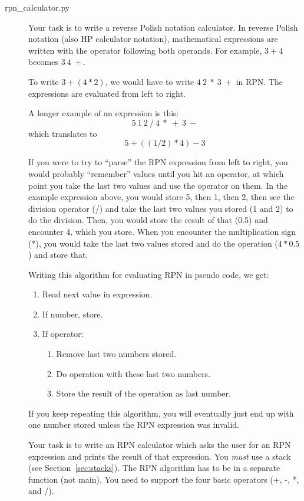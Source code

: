 \documentclass[11pt]{cselabheader}
\begin{document}
\begin{description}
  \item[rpn\_calculator.py] Your task is to write a reverse Polish notation
    calculator. In reverse Polish notation (also HP
    calculator notation), mathematical expressions are written with the operator
    following both operands. For example, $3 + 4$ becomes $3~4~+$.

    To write $3 + (4 * 2)$, we would have to write $4~2~*~3~+$ in RPN. The
    expressions are evaluated from left to right.

    A longer example of an expression is this: 
    \[ 5~1~2~/~4~*~+~3~- \]
    which translates to
    \[ 5 + ( (1 / 2) * 4 ) - 3 \]

    If you were to try to ``parse'' the RPN expression from left to right, you
    would probably ``remember'' values until you hit an operator, at which point
    you take the last two values and use the operator on them. In the example
    expression above, you would store 5, then 1, then 2, then see the division
    operator (/) and take the last two values you stored (1 and 2) to do the
    division. Then, you would store the result of that (0.5) and encounter
    4, which you store. When you encounter the multiplication sign (*), you
    would take the last two values stored and do the operation ($4 * 0.5$)
    and store that. 

    Writing this algorithm for evaluating RPN in pseudo code, we get:

\begin{enumerate}
  \item Read next value in expression.
  \item If number, store.
  \item If operator:
    \begin{enumerate}
      \item Remove last two numbers stored.
      \item Do operation with these last two numbers.
      \item Store the result of the operation as last number.
    \end{enumerate}
\end{enumerate}

    If you keep repeating this algorithm, you will eventually just end up with
    one number stored unless the RPN expression was invalid.

    Your task is to write an RPN calculator which asks the user for an RPN
    expression and prints the result of that expression. You \emph{must} use a
    stack (see Section~\ref{sec:stacks}). The RPN algorithm has to be in a
    separate function (not main). You need to support the four basic operators
    (+, -, *, and /).


\end{description}
\end{document}
